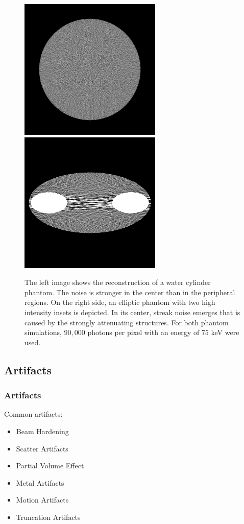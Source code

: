 \begin{frame}[allowframebreaks]
	\begin{figure}
		\begin{center}
			\includegraphics[width=0.25\linewidth]{images/noise1}
			\hspace{1cm}
			\includegraphics[width=0.25\linewidth]{images/noise2}
		\end{center}
		\caption{The left image shows the reconstruction of a water cylinder phantom. The noise is stronger in the center than in the peripheral regions. On the right side, an elliptic phantom with two high intensity insets is depicted. In its center, streak noise emerges that is caused by the strongly attenuating structures. For both phantom simulations, $90{,}000$ photons per pixel with an energy of $75$ keV were used.}%
		\label{fig:ct_noise}
	\end{figure}

\end{frame}

\subsection{Artifacts}

\begin{frame}
	\frametitle{Artifacts}

	Common artifacts:

	\begin{itemize}
		\setlength\itemsep{0.3cm}
		\item Beam Hardening
		\item Scatter Artifacts
		\item Partial Volume Effect
		\item Metal Artifacts
		\item Motion Artifacts
		\item Truncation Artifacts
	\end{itemize}

\end{frame}

